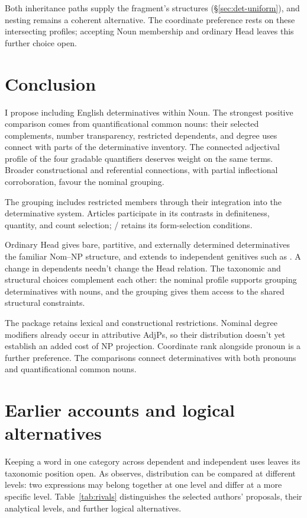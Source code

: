 \documentclass[12pt]{article}
\begin{document}
Both inheritance paths supply the fragment's structures (§\ref{sec:det-uniform}), and nesting remains a coherent alternative. The coordinate preference rests on these intersecting profiles; accepting Noun membership and ordinary Head leaves this further choice open.

\section{Conclusion}\label{sec:conclusion}

I propose including English determinatives within Noun. The strongest positive comparison comes from quantificational common nouns: their selected complements, number transparency, restricted dependents, and degree uses connect with parts of the determinative inventory. The connected adjectival profile of the four gradable quantifiers deserves weight on the same terms. Broader constructional and referential connections, with partial inflectional corroboration, favour the nominal grouping.

The grouping includes restricted members through their integration into the determinative system. Articles participate in its contrasts in definiteness, quantity, and count selection; / retains its form-selection conditions.

Ordinary Head gives bare, partitive, and externally determined determinatives the familiar Nom--NP structure, and extends to independent genitives such as . A change in dependents needn't change the Head relation. The taxonomic and structural choices complement each other: the nominal profile supports grouping determinatives with nouns, and the grouping gives them access to the shared structural constraints.

The package retains lexical and constructional restrictions. Nominal degree modifiers already occur in attributive AdjPs, so their distribution doesn't yet establish an added cost of NP projection. Coordinate rank alongside pronoun is a further preference. The comparisons connect determinatives with both pronouns and quantificational common nouns.

\appendix

\section{Earlier accounts and logical alternatives}\label{sec:historical}

Keeping a word in one category across dependent and independent uses leaves its taxonomic position open. As \textcite[232--235]{lyons1968} observes, distribution can be compared at different levels: two expressions may belong together at one level and differ at a more specific level. Table~\ref{tab:rivals} distinguishes the selected authors' proposals, their analytical levels, and further logical alternatives.
\end{document}
